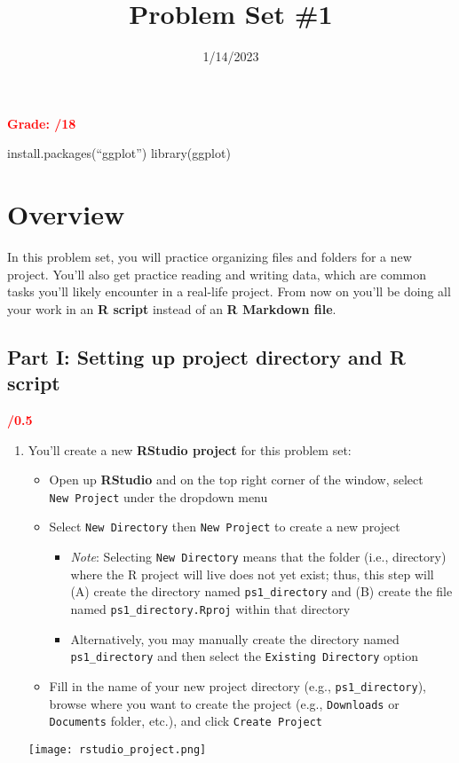 \documentclass[
]{article}
\title{Problem Set \#1}
\author{}
\date{\vspace{-2.5em}1/14/2023}
\providecommand{\tightlist}{%
  \setlength{\itemsep}{0pt}\setlength{\parskip}{0pt}}
\begin{document}
\maketitle

\textcolor{red}{\textbf{Grade: /18}}

install.packages(``ggplot'') library(ggplot)

\hypertarget{overview}{%
\section{Overview}\label{overview}}

In this problem set, you will practice organizing files and folders for
a new project. You'll also get practice reading and writing data, which
are common tasks you'll likely encounter in a real-life project. From
now on you'll be doing all your work in an \textbf{R script} instead of
an \textbf{R Markdown file}.

\hypertarget{part-i-setting-up-project-directory-and-r-script}{%
\subsection{Part I: Setting up project directory and R
script}\label{part-i-setting-up-project-directory-and-r-script}}

\textcolor{red}{\textbf{/0.5}}

\begin{enumerate}
\def\labelenumi{\arabic{enumi}.}
\item
  You'll create a new \textbf{RStudio project} for this problem set:

  \begin{itemize}
  \tightlist
  \item
    Open up \textbf{RStudio} and on the top right corner of the window,
    select \texttt{New\ Project} under the dropdown menu
  \item
    Select \texttt{New\ Directory} then \texttt{New\ Project} to create
    a new project

    \begin{itemize}
    \tightlist
    \item
      \emph{Note}: Selecting \texttt{New\ Directory} means that the
      folder (i.e., directory) where the R project will live does not
      yet exist; thus, this step will (A) create the directory named
      \texttt{ps1\_directory} and (B) create the file named
      \texttt{ps1\_directory.Rproj} within that directory
    \item
      Alternatively, you may manually create the directory named
      \texttt{ps1\_directory} and then select the
      \texttt{Existing\ Directory} option
    \end{itemize}
  \item
    Fill in the name of your new project directory (e.g.,
    \texttt{ps1\_directory}), browse where you want to create the
    project (e.g., \texttt{Downloads} or \texttt{Documents} folder,
    etc.), and click \texttt{Create\ Project}
  \end{itemize}

  \texttt{[image: rstudio\_project.png]}
\end{enumerate}
\end{document}
